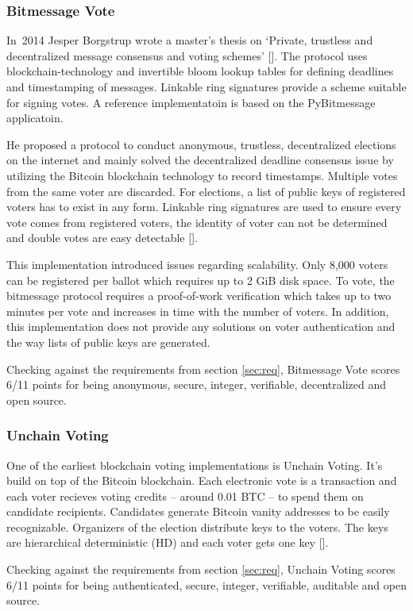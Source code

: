 \subsubsection{Bitmessage Vote}
In~2014 Jesper Borgstrup wrote a master's thesis on \enquote*{Private, trustless and decentralized message consensus and voting schemes} [\cite{BORGSTRUP2014}]. The protocol uses blockchain-technology and invertible bloom lookup tables for defining deadlines and timestamping of messages. Linkable ring signatures provide a scheme suitable for signing votes. A reference implementatoin is based on the PyBitmessage applicatoin.\par
He proposed a protocol to conduct anonymous, trustless, decentralized elections on the internet and mainly solved the decentralized deadline consensus issue by utilizing the Bitcoin blockchain technology to record timestamps. Multiple votes from the same voter are discarded. For elections, a list of public keys of registered voters has to exist in any form. Linkable ring signatures are used to ensure every vote comes from registered voters, the identity of voter can not be determined and double votes are easy detectable [\cite{BORGSTRUP2014}].\par
This implementation introduced issues regarding scalability. Only 8,000 voters can be registered per ballot which requires up to 2 GiB disk space. To vote, the bitmessage protocol requires a proof-of-work verification which takes up to two minutes per vote and increases in time with the number of voters. In addition, this implementation does not provide any solutions on voter authentication and the way lists of public keys are generated.\par
Checking against the requirements from section \ref{sec:req}, Bitmessage Vote scores 6/11 points for being anonymous, secure, integer, verifiable, decentralized and open source.

\subsubsection{Unchain Voting}
One of the earliest blockchain voting implementations is Unchain Voting. It's build on top of the Bitcoin blockchain. Each electronic vote is a transaction and each voter recieves voting credits -- around 0.01 BTC -- to spend them on candidate recipients. Candidates generate Bitcoin vanity addresses to be easily recognizable. Organizers of the election distribute keys to the voters. The keys are hierarchical deterministic (HD) and each voter gets one key [\cite{NOIZAT2014}].\par
Checking against the requirements from section \ref{sec:req}, Unchain Voting scores 6/11 points for being authenticated, secure, integer, verifiable, auditable and open source.

